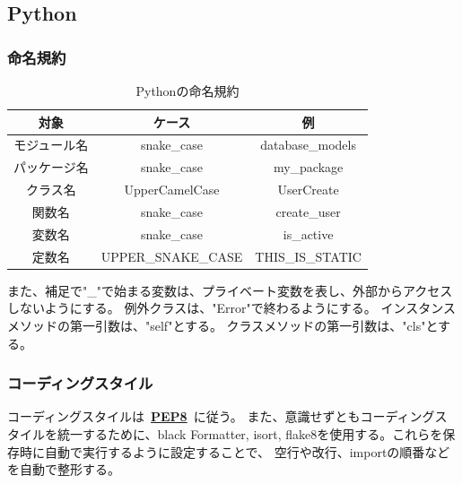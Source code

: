 \subsection{Python}\label{sec:python}
\subsubsection{命名規約}
\begin{table}[H]
  \centering
  \caption{Pythonの命名規約}
  \label{tab:code-python}
  \begin{tabular}{|c|c|c|} \hline
    対象     & ケース                & 例                \\ \hline \hline
    モジュール名 & snake\_case        & database\_models \\ \hline
    パッケージ名 & snake\_case        & my\_package      \\ \hline
    クラス名   & UpperCamelCase     & UserCreate       \\ \hline
    関数名    & snake\_case        & create\_user     \\ \hline
    変数名    & snake\_case        & is\_active       \\ \hline
    定数名    & UPPER\_SNAKE\_CASE & THIS\_IS\_STATIC \\ \hline
  \end{tabular}
\end{table}
また、補足で"\_"で始まる変数は、プライベート変数を表し、外部からアクセスしないようにする。
例外クラスは、"Error"で終わるようにする。
インスタンスメソッドの第一引数は、"self"とする。
クラスメソッドの第一引数は、"cls"とする。
\subsubsection{コーディングスタイル}
コーディングスタイルは~\href{https://pep8-ja.readthedocs.io/ja/latest}{\textbf{PEP8}}~に従う。
また、意識せずともコーディングスタイルを統一するために、black Formatter,
isort, flake8を使用する。これらを保存時に自動で実行するように設定することで、
空行や改行、importの順番などを自動で整形する。
